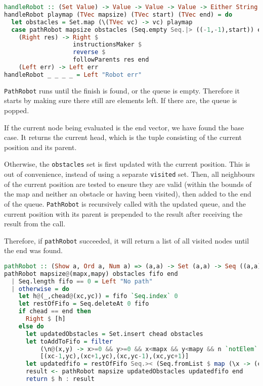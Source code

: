 \begin{lstlisting}[caption={},language=haskell]
handleRobot :: (Set Value) -> Value -> Value -> Value -> Either String String
handleRobot playmap (TVec mapsize) (TVec start) (TVec end) = do
  let obstacles = Set.map (\(TVec vc) -> vc) playmap
  case pathRobot mapsize obstacles (Seq.empty Seq.|> ((-1,-1),start)) end of
    (Right res) -> Right $
                   instructionsMaker $
                   reverse $
                   followParents res end
    (Left err) -> Left err
handleRobot _ _ _ _ = Left "Robot err"
\end{lstlisting}

\lstinline{PathRobot} runs until the finish is found, or the queue is empty. Therefore it starts by making sure there still are elements left. If there are, the queue is popped.
\par
If the current node being evaluated is the end vector, we have found the base case. It returns the current head, which is the tuple consisting of the current position and its parent.
\par
Otherwise, the \lstinline{obstacles} set is first updated with the current position. This is out of convenience, instead of using a separate \lstinline{visited} set. Then, all neighbours of the current position are tested to ensure they are valid (within the bounds of the map and neither an obstacle or having been visited), then added to the end of the queue. \lstinline{PathRobot} is recursively called with the updated queue, and the current position with its parent is prepended to the result after receiving the result from the call.
\par
Therefore, if \lstinline{pathRobot} succeeded, it will return a list of all visited nodes until the end was found.

\begin{lstlisting}[caption={},language=haskell]
pathRobot :: (Show a, Ord a, Num a) => (a,a) -> Set (a,a) -> Seq ((a,a),(a,a)) -> (a,a) -> Either String [((a,a),(a,a))]
pathRobot mapsize@(mapx,mapy) obstacles fifo end
  | Seq.length fifo == 0 = Left "No path"
  | otherwise = do
    let h@(_,chead@(xc,yc)) = fifo `Seq.index` 0
    let restOfFifo = Seq.deleteAt 0 fifo
    if chead == end then
      Right $ [h]
    else do
      let updatedObstacles = Set.insert chead obstacles
      let toAddToFifo = filter 
          (\n@(x,y) -> x>=0 && y>=0 && x<mapx && y<mapy && n `notElem` obstacles )
          [(xc-1,yc),(xc+1,yc),(xc,yc-1),(xc,yc+1)]
      let updatedfifo = restOfFifo Seq.>< (Seq.fromList $ map (\x -> (chead,x)) toAddToFifo)
      result <- pathRobot mapsize updatedObstacles updatedfifo end
      return $ h : result
\end{lstlisting}

